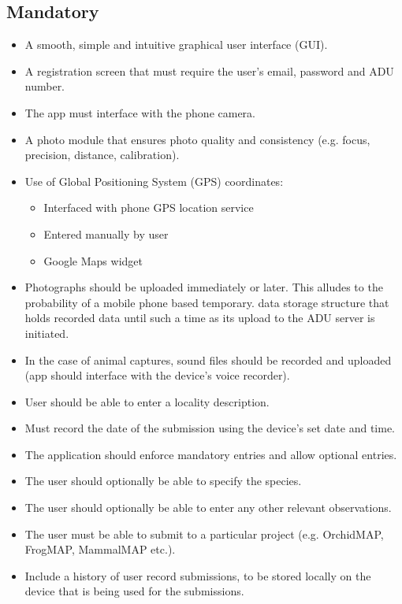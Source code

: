 \documentclass[12pt,a4paper,oneside]{report}
\begin{document}
\subsection{Mandatory}
    \begin{itemize}
      \item A smooth, simple and intuitive graphical user interface (GUI).
      \item A registration screen that must require the user's email, password and ADU number.
      \item The app must interface with the phone camera.
      \item A photo module that ensures photo quality and consistency (e.g. focus, precision, distance, calibration).
      \item Use of Global Positioning System (GPS) coordinates:
        \begin{itemize}
          \item Interfaced with phone GPS location service
          \item Entered manually by user
          \item Google Maps widget
        \end{itemize}
      \item Photographs should be uploaded immediately or later.  This alludes to the probability of a mobile phone based temporary. data storage structure that holds recorded data until such a time as its upload to the ADU server is initiated.
      \item In the case of animal captures, sound files should be recorded and uploaded (app should interface with the device's voice recorder).
      \item User should be able to enter a locality description.
      \item Must record the date of the submission using the device's set date and time.
			\item The application should enforce mandatory entries and allow optional entries.
      \item The user should optionally be able to specify the species.
      \item The user should optionally be able to enter any other relevant observations.
      \item The user must be able to submit to a particular project (e.g. OrchidMAP, FrogMAP, MammalMAP etc.).
      \item Include a history of user record submissions, to be stored locally on the device that is being used for the submissions.
    \end{itemize}
\end{document}
